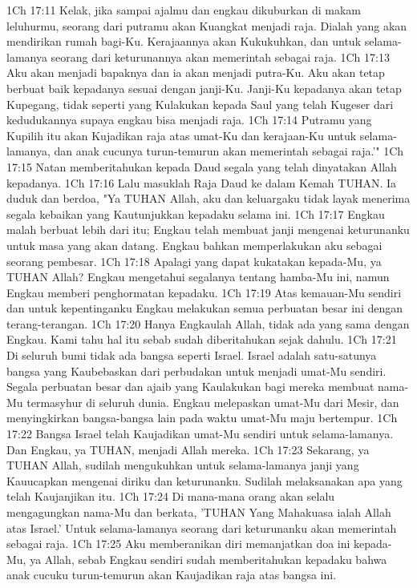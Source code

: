 1Ch 17:11  Kelak, jika sampai ajalmu dan engkau dikuburkan di makam leluhurmu, seorang dari putramu akan Kuangkat menjadi raja. Dialah yang akan mendirikan rumah bagi-Ku. Kerajaannya akan Kukukuhkan, dan untuk selama-lamanya seorang dari keturunannya akan memerintah sebagai raja.
1Ch 17:13  Aku akan menjadi bapaknya dan ia akan menjadi putra-Ku. Aku akan tetap berbuat baik kepadanya sesuai dengan janji-Ku. Janji-Ku kepadanya akan tetap Kupegang, tidak seperti yang Kulakukan kepada Saul yang telah Kugeser dari kedudukannya supaya engkau bisa menjadi raja.
1Ch 17:14  Putramu yang Kupilih itu akan Kujadikan raja atas umat-Ku dan kerajaan-Ku untuk selama-lamanya, dan anak cucunya turun-temurun akan memerintah sebagai raja.'"
1Ch 17:15  Natan memberitahukan kepada Daud segala yang telah dinyatakan Allah kepadanya.
1Ch 17:16  Lalu masuklah Raja Daud ke dalam Kemah TUHAN. Ia duduk dan berdoa, "Ya TUHAN Allah, aku dan keluargaku tidak layak menerima segala kebaikan yang Kautunjukkan kepadaku selama ini.
1Ch 17:17  Engkau malah berbuat lebih dari itu; Engkau telah membuat janji mengenai keturunanku untuk masa yang akan datang. Engkau bahkan memperlakukan aku sebagai seorang pembesar.
1Ch 17:18  Apalagi yang dapat kukatakan kepada-Mu, ya TUHAN Allah? Engkau mengetahui segalanya tentang hamba-Mu ini, namun Engkau memberi penghormatan kepadaku.
1Ch 17:19  Atas kemauan-Mu sendiri dan untuk kepentinganku Engkau melakukan semua perbuatan besar ini dengan terang-terangan.
1Ch 17:20  Hanya Engkaulah Allah, tidak ada yang sama dengan Engkau. Kami tahu hal itu sebab sudah diberitahukan sejak dahulu.
1Ch 17:21  Di seluruh bumi tidak ada bangsa seperti Israel. Israel adalah satu-satunya bangsa yang Kaubebaskan dari perbudakan untuk menjadi umat-Mu sendiri. Segala perbuatan besar dan ajaib yang Kaulakukan bagi mereka membuat nama-Mu termasyhur di seluruh dunia. Engkau melepaskan umat-Mu dari Mesir, dan menyingkirkan bangsa-bangsa lain pada waktu umat-Mu maju bertempur.
1Ch 17:22  Bangsa Israel telah Kaujadikan umat-Mu sendiri untuk selama-lamanya. Dan Engkau, ya TUHAN, menjadi Allah mereka.
1Ch 17:23  Sekarang, ya TUHAN Allah, sudilah mengukuhkan untuk selama-lamanya janji yang Kauucapkan mengenai diriku dan keturunanku. Sudilah melaksanakan apa yang telah Kaujanjikan itu.
1Ch 17:24  Di mana-mana orang akan selalu mengagungkan nama-Mu dan berkata, 'TUHAN Yang Mahakuasa ialah Allah atas Israel.' Untuk selama-lamanya seorang dari keturunanku akan memerintah sebagai raja.
1Ch 17:25  Aku memberanikan diri memanjatkan doa ini kepada-Mu, ya Allah, sebab Engkau sendiri sudah memberitahukan kepadaku bahwa anak cucuku turun-temurun akan Kaujadikan raja atas bangsa ini.
